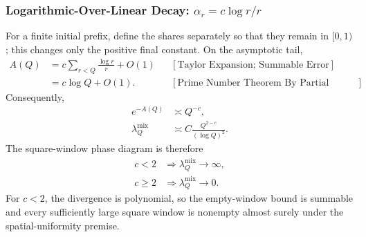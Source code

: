 \subsubsection*{Logarithmic-Over-Linear Decay: $\alpha_r= c\log r/r$}
For a finite initial prefix, define the shares separately so that they remain in $[0,1)$; this changes only the positive final constant. On the asymptotic tail,
\begin{equation*}
\begin{aligned}
A(Q)
&=c\sum_{r < Q}\frac{\log r}{r}+O(1)
&&[\text{Taylor Expansion; Summable Error}]\\
&=c\log Q+O(1).
&&[\text{Prime Number Theorem By Partial Summation}]
\end{aligned}
\end{equation*}
Consequently,
\begin{equation*}
\begin{aligned}
e^{-A(Q)}&\asymp Q^{-c},\\
\lambda_Q^{\mathrm{mix}}
&\asymp C\frac{Q^{2-c}}{(\log Q)^2}.
\end{aligned}
\end{equation*}
The square-window phase diagram is therefore
\begin{equation*}
\begin{aligned}
c < 2&\Longrightarrow\lambda_Q^{\mathrm{mix}}\longrightarrow\infty,\\
c\ge 2&\Longrightarrow\lambda_Q^{\mathrm{mix}}\longrightarrow0.
\end{aligned}
\end{equation*}
For $c < 2$, the divergence is polynomial, so the empty-window bound is summable and every sufficiently large square window is nonempty almost surely under the spatial-uniformity premise.
